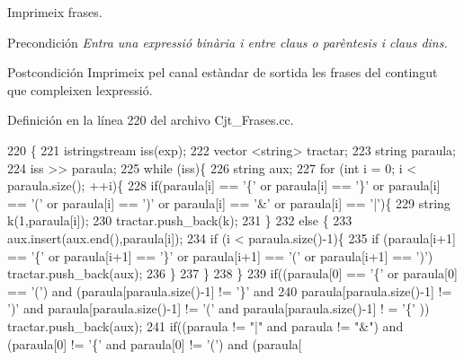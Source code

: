 Imprimeix frases. 

\begin{DoxyPrecond}{Precondición}
{\itshape Entra una expressió binària i entre claus o parèntesis i claus dins.} 
\end{DoxyPrecond}
\begin{DoxyPostcond}{Postcondición}
Imprimeix pel canal estàndar de sortida les frases del contingut que compleixen l\textquotesingle{}expressió. 
\end{DoxyPostcond}


Definición en la línea 220 del archivo Cjt\+\_\+\+Frases.\+cc.


\begin{DoxyCode}
220                                      \{
221   istringstream iss(exp);
222   vector <string> tractar;
223   \textcolor{keywordtype}{string} paraula;
224   iss >> paraula;
225   \textcolor{keywordflow}{while} (iss)\{
226         \textcolor{keywordtype}{string} aux;
227     \textcolor{keywordflow}{for} (\textcolor{keywordtype}{int} i = 0; i < paraula.size(); ++i)\{
228       \textcolor{keywordflow}{if}(paraula[i] == \textcolor{charliteral}{'\{'} or paraula[i] == \textcolor{charliteral}{'\}'} or paraula[i] == \textcolor{charliteral}{'('} or paraula[i] == \textcolor{charliteral}{')'} or paraula[i] == \textcolor{charliteral}{
      '&'} or paraula[i] == \textcolor{charliteral}{'|'})\{
229         \textcolor{keywordtype}{string} k(1,paraula[i]);
230         tractar.push\_back(k); 
231       \}
232       \textcolor{keywordflow}{else} \{
233         aux.insert(aux.end(),paraula[i]);
234                 \textcolor{keywordflow}{if} (i < paraula.size()-1)\{
235                     \textcolor{keywordflow}{if} (paraula[i+1] == \textcolor{charliteral}{'\{'} or paraula[i+1] == \textcolor{charliteral}{'\}'} or paraula[i+1] == \textcolor{charliteral}{'('} or paraula[i+1] 
      == \textcolor{charliteral}{')'}) tractar.push\_back(aux);               
236         \}
237       \}
238     \}
239         \textcolor{keywordflow}{if}((paraula[0] == \textcolor{charliteral}{'\{'} or paraula[0] == \textcolor{charliteral}{'('}) and (paraula[paraula.size()-1] != \textcolor{charliteral}{'\}'} and 
240       paraula[paraula.size()-1] != \textcolor{charliteral}{')'} and paraula[paraula.size()-1] != \textcolor{charliteral}{'('} and paraula[paraula.size()-1] !
      = \textcolor{charliteral}{'\{'} )) tractar.push\_back(aux);
241     \textcolor{keywordflow}{if}((paraula != \textcolor{stringliteral}{"|"} and paraula != \textcolor{stringliteral}{"&"}) and (paraula[0] != \textcolor{charliteral}{'\{'} and paraula[0] != \textcolor{charliteral}{'('}) and (paraula[

\end{DoxyCode}
